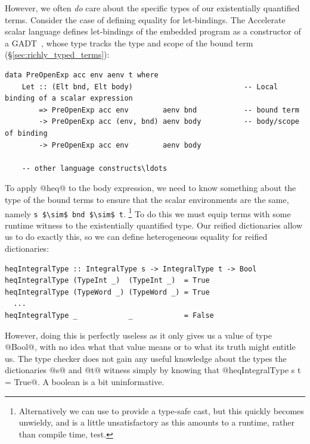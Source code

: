 However, we often \emph{do} care about the specific types of our existentially
quantified terms. Consider the case of defining equality for let-bindings.
The Accelerate scalar language defines let-bindings of the embedded program as a
constructor of a GADT~\cite{Jones:2006eh}, whose type tracks the type and scope
of the bound term (\S\ref{sec:richly_typed_terms}):
%
\begin{lstlisting}[style=haskell]
data PreOpenExp acc env aenv t where
    Let :: (Elt bnd, Elt body)                          -- Local binding of a scalar expression
        => PreOpenExp acc env        aenv bnd           -- bound term
        -> PreOpenExp acc (env, bnd) aenv body          -- body/scope of binding
        -> PreOpenExp acc env        aenv body

    -- other language constructs\ldots
\end{lstlisting}
%
To apply @heq@ to the body expression, we need to know something about
the type of the bound terms to ensure that the scalar environments are the same,
namely \lstinline[style=inline,mathescape]{s $\sim$ bnd $\sim$ t}.%
\footnote{Alternatively we can use  to provide a
type-safe cast, but this quickly becomes unwieldy, and is a little
unsatisfactory as this amounts to a runtime, rather than compile time, test.} To
do this we must equip terms with some runtime witness to the existentially
quantified type. Our reified dictionaries allow us to do exactly this, so we can
define heterogeneous equality for reified dictionaries:
%
\begin{lstlisting}[style=haskell]
heqIntegralType :: IntegralType s -> IntegralType t -> Bool
heqIntegralType (TypeInt _)  (TypeInt _)  = True
heqIntegralType (TypeWord _) (TypeWord _) = True
  ...
heqIntegralType _            _            = False
\end{lstlisting}
%
However, doing this is perfectly useless as it only gives us a value of type
@Bool@, with no idea what that value means or to what its truth might
entitle us. The type checker does not gain any useful knowledge about the types
the dictionaries @s@ and @t@ witness simply by knowing that
@heqIntegralType s t = True@. A boolean is a bit uninformative.

